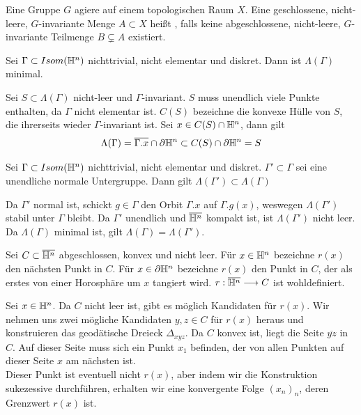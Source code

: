 \documentclass{book}
\begin{document}
\Def{}
Eine Gruppe $G$ agiere auf einem topologischen Raum $X$. Eine geschlossene, nicht-leere, $G$-invariante Menge $A \subset X$ heißt , falls keine abgeschlossene, nicht-leere, $G$-invariante Teilmenge $B \subsetneq A$ existiert.

\Prop{}
Sei $\Gamma \subset Isom(\mathbb{H}^n)$ nichttrivial, nicht elementar und diskret.
Dann ist $\Lambda(\Gamma)$ minimal.
\begin{Beweis}{}
	Sei $S \subset \Lambda(\Gamma)$ nicht-leer und $\Gamma$-invariant. $S$ muss unendlich viele Punkte enthalten, da $\Gamma$ nicht elementar ist. $C(S)$ bezeichne die konvexe Hülle von $S$, die ihrerseits wieder $\Gamma$-invariant ist. Sei $x \in C(S) \cap \mathbb{H}^n$, dann gilt
	\[ \Lambda(\Gamma) = \overline{\Gamma.x} \cap \partial \mathbb{H}^n \subset C(S) \cap \partial \mathbb{H}^n = S \] 
\end{Beweis}

\Kor{}
Sei $\Gamma \subset Isom(\mathbb{H}^n)$ nichttrivial, nicht elementar und diskret. $\Gamma' \subset \Gamma$ sei eine unendliche normale Untergruppe. Dann gilt $\Lambda(\Gamma') \subset \Lambda(\Gamma)$
\begin{Beweis}{}
	Da $\Gamma'$ normal ist, schickt $g \in \Gamma$ den Orbit $\Gamma.x$ auf $\Gamma.g(x)$, weswegen $\Lambda(\Gamma')$ stabil unter $\Gamma$ bleibt. Da $\Gamma'$ unendlich und $\overline{\mathbb{H}^n}$ kompakt ist, ist $\Lambda(\Gamma')$ nicht leer. Da $\Lambda(\Gamma)$ minimal ist, gilt $\Lambda(\Gamma) = \Lambda(\Gamma')$.
\end{Beweis}

\Lem{}
Sei $C \subset \overline{\mathbb{H}^n}$ abgeschlossen, konvex und nicht leer. Für $x \in \mathbb{H}^n$ bezeichne $r(x)$ den nächsten Punkt in $C$. Für $x\in \partial\mathbb{H}^n$ bezeichne $r(x)$ den Punkt in $C$, der als erstes von einer Horosphäre um $x$ tangiert wird. $r : \overline{\mathbb{H}^n} \overset{}{\longrightarrow} C$ ist wohldefiniert.
\begin{Beweis}{}
	Sei $x\in {\mathbb{H}^n}$. Da $C$ nicht leer ist, gibt es möglich Kandidaten für $r(x)$. Wir nehmen uns zwei mögliche Kandidaten $y,z \in C$ für $r(x)$ heraus und konstruieren das geodätische Dreieck $\Delta_{xyz}$. Da $C$ konvex ist, liegt die Seite $\overline{yz}$ in $C$. Auf dieser Seite muss sich ein Punkt $x_1$ befinden, der von allen Punkten auf dieser Seite $x$ am nächsten ist.\\
	Dieser Punkt ist eventuell nicht $r(x)$, aber indem wir die Konstruktion sukezessive durchführen, erhalten wir eine konvergente Folge $(x_n)_n$, deren Grenzwert $r(x)$ ist.
\end{Beweis}
\end{document}
